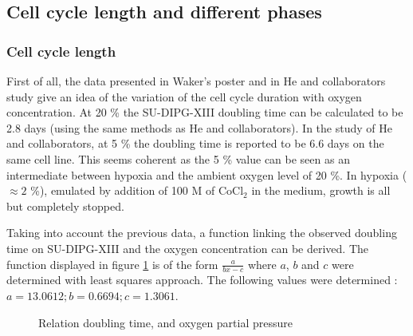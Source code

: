 \documentclass[11pt,a4paper]{article}
\begin{document}
\subsection{Cell cycle length and different phases}
\subsubsection{Cell cycle length}
First of all, the data presented in Waker's poster and in He and collaborators study give an idea of the variation of the cell cycle duration with oxygen concentration. At 20 \% the SU-DIPG-XIII doubling time can be calculated to be 2.8 days (using the same methods as He and collaborators). In the study of He and collaborators, at 5 \% the doubling time is reported to be 6.6 days on the same cell line.\cite{He2021} This seems coherent as the 5 \% value can be seen as an intermediate between hypoxia and the ambient oxygen level of 20 \%. In hypoxia ($\approx 2$ \%), emulated by addition of 100 \textmu M of CoCl$_2$ in the medium, growth is all but completely stopped.\cite{Waker2018}

Taking into account the previous data, a function linking the observed doubling time on SU-DIPG-XIII and the oxygen concentration can be derived. The function displayed in figure \ref{podbl} is of the form $\frac{a}{b x - c }$ where $a$, $b$ and $c$ were determined with least squares approach. The following values were determined : $a =  13.0612;  b = 0.6694; c = 1.3061$.

\begin{figure}[ht!]
\vspace{1cm}
\hspace{4cm} 
  \caption{Relation doubling time, and oxygen partial pressure \label{podbl}}
\end{figure}
\end{document}
